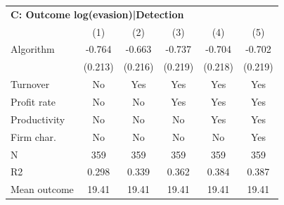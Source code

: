 \begin{tabular}{lccccc}
\midrule \multicolumn{6}{l}{\textbf{C: Outcome log(evasion)|Detection}} \\ \multicolumn{1}{l}{} & (1) & (2) & (3) & (4) & (5) \\ \midrule
Algorithm   &      -0.764\sym{***}&      -0.663\sym{***}&      -0.737\sym{***}&      -0.704\sym{***}&      -0.702\sym{***}\\
            &     (0.213)         &     (0.216)         &     (0.219)         &     (0.218)         &     (0.219)         \\
\midrule
Turnover    &          No         &         Yes         &         Yes         &         Yes         &         Yes         \\
Profit rate &          No         &          No         &         Yes         &         Yes         &         Yes         \\
Productivity&          No         &          No         &          No         &         Yes         &         Yes         \\
Firm char.  &          No         &          No         &          No         &          No         &         Yes         \\
N           &         359         &         359         &         359         &         359         &         359         \\
R2          &       0.298         &       0.339         &       0.362         &       0.384         &       0.387         \\
Mean outcome&       19.41         &       19.41         &       19.41         &       19.41         &       19.41         \\
\bottomrule \end{tabular}
